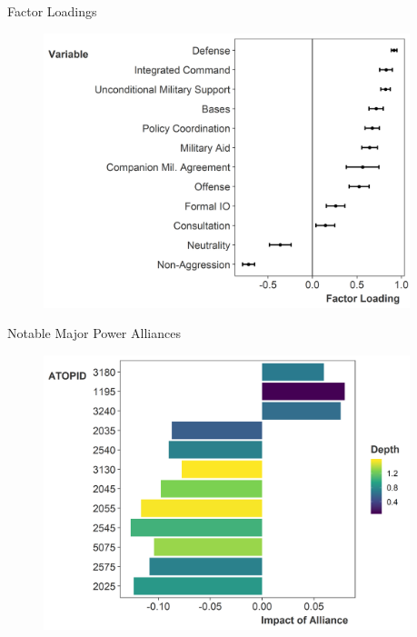 \documentclass[12pt]{beamer}
\begin{document}
\begin{frame}{Factor Loadings}


\begin{figure}
	\centering
		\includegraphics[width=0.95\textwidth]{factor-loadings.png}
\end{figure}


\end{frame}




\begin{frame}{Notable Major Power Alliances}


\begin{figure}
	\centering
		\includegraphics[width=0.95\textwidth]{non-zero-maj.png}
	\label{fig:non-zero-maj}
\end{figure}


\end{frame}
\end{document}
